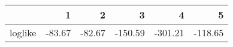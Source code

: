 \begin{table}[ht]
\centering
\begin{tabular}{rrrrrr}
  \hline
 & 1 & 2 & 3 & 4 & 5 \\ 
  \hline
loglike & -83.67 & -82.67 & -150.59 & -301.21 & -118.65 \\ 
   \hline
\end{tabular}
\caption{} 
\label{fig audit-risk-5CV}
\end{table}
